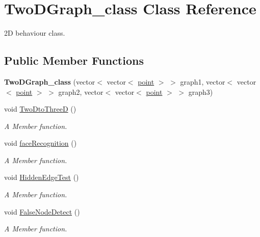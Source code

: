 \hypertarget{classTwoDGraph__class}{}\section{Two\+D\+Graph\+\_\+class Class Reference}
\label{classTwoDGraph__class}


2D behaviour class.  


\subsection*{Public Member Functions}
\begin{DoxyCompactItemize}
\item 
{\bfseries Two\+D\+Graph\+\_\+class} (vector$<$ vector$<$ \hyperlink{structpoint}{point} $>$ $>$ graph1, vector$<$ vector$<$ \hyperlink{structpoint}{point} $>$ $>$ graph2, vector$<$ vector$<$ \hyperlink{structpoint}{point} $>$ $>$ graph3)\hypertarget{classTwoDGraph__class_aa666c42d1e81f8da8cc9229f46c572f5}{}\label{classTwoDGraph__class_aa666c42d1e81f8da8cc9229f46c572f5}

\item 
void \hyperlink{classTwoDGraph__class_a48222790dda1c34caf1366ce1cc0ce1d}{Two\+Dto\+ThreeD} ()
\begin{DoxyCompactList}\small\item\em A Member function. \end{DoxyCompactList}\item 
void \hyperlink{classTwoDGraph__class_af0b7cb652fec315e79e0f4826c64ae6d}{face\+Recognition} ()
\begin{DoxyCompactList}\small\item\em A Member function. \end{DoxyCompactList}\item 
void \hyperlink{classTwoDGraph__class_a551441ccdbceddd7c5d7df8c3a0a3e04}{Hidden\+Edge\+Test} ()
\begin{DoxyCompactList}\small\item\em A Member function. \end{DoxyCompactList}\item 
void \hyperlink{classTwoDGraph__class_aac6062b9859be331a44d1fe61036d5a1}{False\+Node\+Detect} ()
\begin{DoxyCompactList}\small\item\em A Member function. \end{DoxyCompactList}\end{DoxyCompactItemize}
